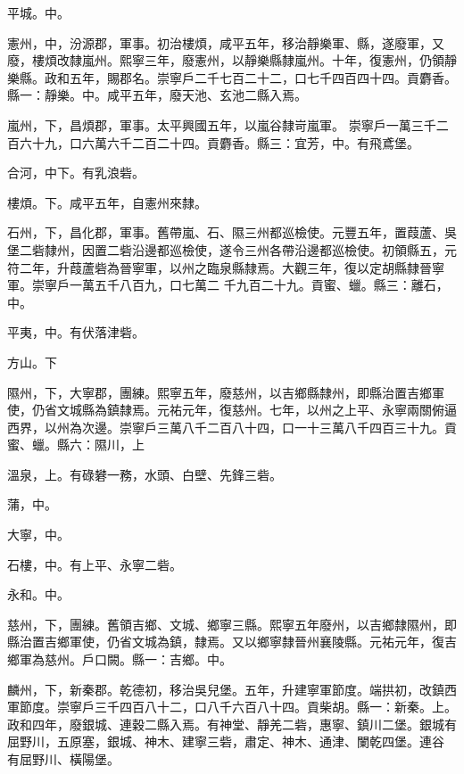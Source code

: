 \begin{pinyinscope}
 平城。中。



 憲州，中，汾源郡，軍事。初治樓煩，咸平五年，移治靜樂軍、縣，遂廢軍，又廢，樓煩改隸嵐州。熙寧三年，廢憲州，以靜樂縣隸嵐州。十年，復憲州，仍領靜樂縣。政和五年，賜郡名。崇寧戶二千七百二十二，口七千四百四十四。貢麝香。縣一：靜樂。中。咸平五年，廢天池、玄池二縣入焉。



 嵐州，下，昌煩郡，軍事。太平興國五年，以嵐谷隸岢嵐軍。
 崇寧戶一萬三千二百六十九，口六萬六千二百二十四。貢麝香。縣三：宜芳，中。有飛鳶堡。



 合河，中下。有乳浪砦。



 樓煩。下。咸平五年，自憲州來隸。



 石州，下，昌化郡，軍事。舊帶嵐、石、隰三州都巡檢使。元豐五年，置葭蘆、吳堡二砦隸州，因置二砦沿邊都巡檢使，遂令三州各帶沿邊都巡檢使。初領縣五，元符二年，升葭蘆砦為晉寧軍，以州之臨泉縣隸焉。大觀三年，復以定胡縣隸晉寧軍。崇寧戶一萬五千八百九，口七萬二
 千九百二十九。貢蜜、蠟。縣三：離石，中。



 平夷，中。有伏落津砦。



 方山。下



 隰州，下，大寧郡，團練。熙寧五年，廢慈州，以吉鄉縣隸州，即縣治置吉鄉軍使，仍省文城縣為鎮隸焉。元祐元年，復慈州。七年，以州之上平、永寧兩關俯逼西界，以州為次邊。崇寧戶三萬八千二百八十四，口一十三萬八千四百三十九。貢蜜、蠟。縣六：隰川，上



 溫泉，上。有碌礬一務，水頭、白壁、先鋒三砦。



 蒲，中。



 大寧，中。



 石樓，中。有上平、永寧二砦。



 永和。中。



 慈州，下，團練。舊領吉鄉、文城、鄉寧三縣。熙寧五年廢州，以吉鄉隸隰州，即縣治置吉鄉軍使，仍省文城為鎮，隸焉。又以鄉寧隸晉州襄陵縣。元祐元年，復吉鄉軍為慈州。戶口闕。縣一：吉鄉。中。



 麟州，下，新秦郡。乾德初，移治吳兒堡。五年，升建寧軍節度。端拱初，改鎮西軍節度。崇寧戶三千四百八十二，口八千六百八十四。貢柴胡。縣一：新秦。上。政和四年，廢銀城、連穀二縣入焉。有神堂、靜羌二砦，惠寧、鎮川二堡。銀城有屈野川，五原塞，銀城、神木、建寧三砦，肅定、神木、通津、闌乾四堡。連谷
 有屈野川、橫陽堡。




\end{pinyinscope}
